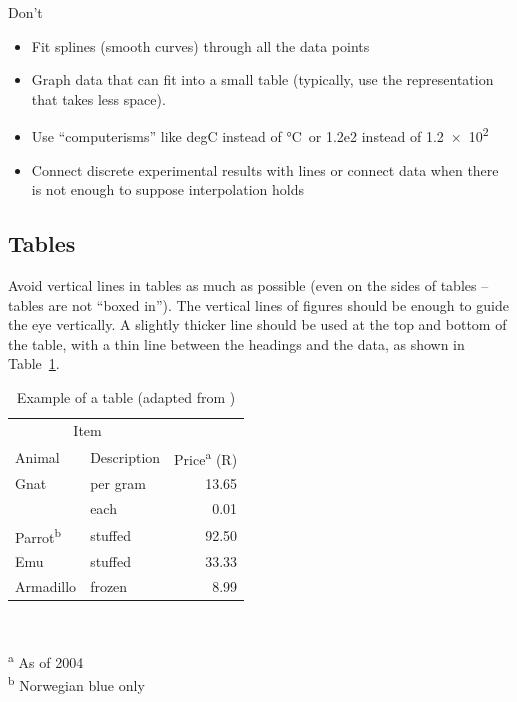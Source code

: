 \documentclass[a5paper, 10pt]{article}
\begin{document}
Don't
\begin{itemize}
\item Fit splines (smooth curves) through all the data points

\item Graph data that can fit into a small table (typically, use the
  representation that takes less space).
\item Use ``computerisms'' like degC instead of \si{\celsius}\ or 1.2e2
  instead of \num{1.2e2} 
\item Connect discrete experimental results with lines or connect data when there is not enough to suppose interpolation holds
\end{itemize}

\subsection{Tables}
Avoid vertical lines in tables as much as possible (even on the sides
of tables -- tables are not ``boxed in'').  The vertical
lines of figures should be enough to guide the eye vertically.  A
slightly thicker line should be used at the top and bottom of the
table, with a thin line between the headings and the data, as shown in
Table~\ref{tab:tabexample}.

\begin{table}[htbp]
  \centering
  \caption{Example of a table (adapted from \citet{fear})}
  \label{tab:tabexample}
  \begin{minipage}{0.5\textwidth}
    \begin{centering}
      \begin{tabular}{@{}llr@{}} \toprule 
        \multicolumn{2}{c}{Item} \\ \cmidrule(r){1-2} 
        Animal & Description & Price\textsuperscript{a} (R)\\ \midrule 
        Gnat & per gram & \num{13.65} \\ 
        & each & \num{0.01} \\ 
        Parrot\textsuperscript{b} & stuffed & \num{92.50} \\ 
        Emu & stuffed & \num{33.33} \\ 
        Armadillo & frozen & \num{8.99} \\ \bottomrule 
      \end{tabular} \\
    \end{centering} 
    \vspace{1em}
    \textsuperscript{a} As of 2004 \\
    \textsuperscript{b} Norwegian blue only
  \end{minipage}
\end{table}
\end{document}
